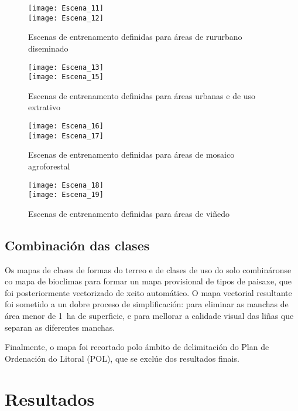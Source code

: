 \documentclass[11pt,a4paper]{article}
\begin{document}
\begin{figure}
\caption{Escenas de entrenamento definidas para áreas de rururbano diseminado}\label{fig:escenas5}
\texttt{[image: Escena\_11]}\\
\texttt{[image: Escena\_12]}
\end{figure}

\begin{figure}
\caption{Escenas de entrenamento definidas para áreas urbanas e de uso extrativo}\label{fig:escenas6}
\texttt{[image: Escena\_13]}\\
\texttt{[image: Escena\_15]}
\end{figure}

\begin{figure}
\caption{Escenas de entrenamento definidas para áreas de mosaico agroforestal}\label{fig:escenas7}
\texttt{[image: Escena\_16]}\\
\texttt{[image: Escena\_17]}
\end{figure}

\begin{figure}
\caption{Escenas de entrenamento definidas para áreas de viñedo}\label{fig:escenas8}
\texttt{[image: Escena\_18]}\\
\texttt{[image: Escena\_19]}
\end{figure}


\subsection{Combinación das clases}

Os mapas de clases de formas do terreo e de clases de uso do solo combináronse co mapa de bioclimas para formar un mapa provisional de tipos de paisaxe, que foi posteriormente vectorizado de xeito automático. O mapa vectorial resultante foi sometido a un dobre proceso de simplificación: para eliminar as manchas de área menor de 1~ha de superficie, e para mellorar a calidade visual das liñas que separan as diferentes manchas.

Finalmente, o mapa foi recortado polo ámbito de delimitación do Plan de Ordenación do Litoral (POL), que se exclúe dos resultados finais.



\section{Resultados}
\end{document}
